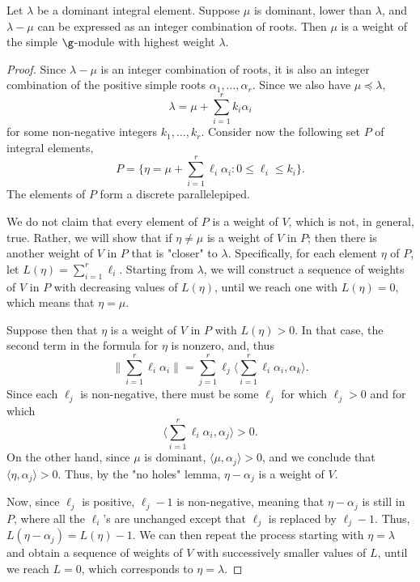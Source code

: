 \begin{proposition}\label{Lie algebra weight of highest module if}
Let $\lambda$ be a dominant integral element. Suppose $\mu$ is dominant, lower than $\lambda$, and $\lambda-\mu$ can be expressed as an integer combination of roots. Then $\mu$ is a weight of the simple $\g$-module with highest weight $\lambda$.
\end{proposition}
\begin{proof}
Since $\lambda-\mu$ is an integer combination of roots, it is also an integer combination of the positive simple roots $\alpha_1,\dots,\alpha_r$. Since we also have $\mu\preceq\lambda$,
\[\lambda=\mu+\sum_{i=1}^{r}k_i\alpha_i\]
for some non-negative integers $k_1,\dots,k_r$. Consider now the following set $P$ of integral elements,
\[P=\{\eta=\mu+\sum_{i=1}^{r}\ell_i\alpha_i:0\leq\ell_i\leq k_i\}.\]
The elements of $P$ form a discrete parallelepiped.\par
We do not claim that every element of $P$ is a weight of $V$, which is not, in general, true. Rather, we will show that if $\eta\neq\mu$ is a weight of $V$ in $P$; then there is another weight of $V$ in $P$ that is "closer" to $\lambda$. Specifically, for each element $\eta$ of $P$, let $L(\eta)=\sum_{i=1}^{r}\ell_i$. Starting from $\lambda$, we will construct a sequence of weights of $V$ in $P$ with decreasing values of $L(\eta)$, until we reach one with $L(\eta)=0$, which means that $\eta=\mu$.\par
Suppose then that $\eta$ is a weight of $V$ in $P$ with $L(\eta)>0$. In that case, the second term in the formula for $\eta$ is nonzero, and, thus
\[\Big\|\sum_{i=1}^{r}\ell_i\alpha_i\Big\|=\sum_{j=1}^{r}\ell_j\langle\sum_{i=1}^{r}\ell_i\alpha_i,\alpha_k\rangle.\]
Since each $\ell_j$ is non-negative, there must be some $\ell_j$ for which $\ell_j>0$ and for which
\[\langle\sum_{i=1}^{r}\ell_i\alpha_i,\alpha_j\rangle>0.\]
On the other hand, since $\mu$ is dominant, $\langle\mu,\alpha_j\rangle>0$, and we conclude that $\langle\eta,\alpha_j\rangle>0$. Thus, by the "no holes" lemma, $\eta-\alpha_j$ is a weight of $V$.\par
Now, since $\ell_j$ is positive, $\ell_j-1$ is non-negative, meaning that $\eta-\alpha_j$ is still in $P$, where all the $\ell_i$'s are unchanged except that $\ell_j$ is replaced by $\ell_j-1$. Thus, $L(\eta-\alpha_j)=L(\eta)-1$. We can then repeat the process starting with $\eta=\lambda$ and obtain a sequence of weights of $V$ with successively smaller values of $L$, until we reach $L=0$, which corresponds to $\eta=\lambda$.
\end{proof}
